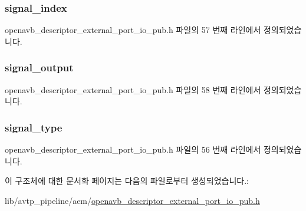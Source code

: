 \subsubsection[{\texorpdfstring{signal\+\_\+index}{signal_index}}]{ signal\+\_\+index}\hypertarget{structopenavb__aem__descriptor__external__port__io__t_ad948e7e79bb182b81a76a51c3d6ee9ed}{}\label{structopenavb__aem__descriptor__external__port__io__t_ad948e7e79bb182b81a76a51c3d6ee9ed}


openavb\+\_\+descriptor\+\_\+external\+\_\+port\+\_\+io\+\_\+pub.\+h 파일의 57 번째 라인에서 정의되었습니다.

\subsubsection[{\texorpdfstring{signal\+\_\+output}{signal_output}}]{ signal\+\_\+output}\hypertarget{structopenavb__aem__descriptor__external__port__io__t_a6a464d21574d97691ea70c2037ff8f6f}{}\label{structopenavb__aem__descriptor__external__port__io__t_a6a464d21574d97691ea70c2037ff8f6f}


openavb\+\_\+descriptor\+\_\+external\+\_\+port\+\_\+io\+\_\+pub.\+h 파일의 58 번째 라인에서 정의되었습니다.

\subsubsection[{\texorpdfstring{signal\+\_\+type}{signal_type}}]{ signal\+\_\+type}\hypertarget{structopenavb__aem__descriptor__external__port__io__t_a51ba5fdff9933eb274b46b67185d1c7b}{}\label{structopenavb__aem__descriptor__external__port__io__t_a51ba5fdff9933eb274b46b67185d1c7b}


openavb\+\_\+descriptor\+\_\+external\+\_\+port\+\_\+io\+\_\+pub.\+h 파일의 56 번째 라인에서 정의되었습니다.



이 구조체에 대한 문서화 페이지는 다음의 파일로부터 생성되었습니다.\+:\begin{DoxyCompactItemize}
\item 
lib/avtp\+\_\+pipeline/aem/\hyperlink{openavb__descriptor__external__port__io__pub_8h}{openavb\+\_\+descriptor\+\_\+external\+\_\+port\+\_\+io\+\_\+pub.\+h}\end{DoxyCompactItemize}
